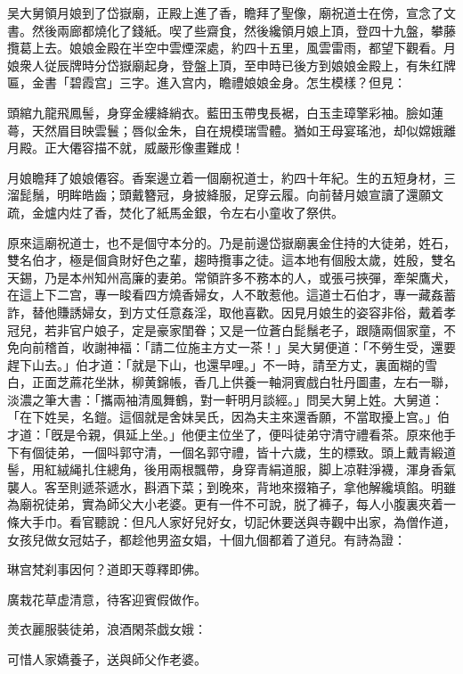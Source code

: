 吴大舅領月娘到了岱嶽廟，正殿上進了香，瞻拜了聖像，廟祝道士在傍，宣念了文書。然後兩廊都燒化了錢紙。喫了些齋食，然後纔領月娘上頂，登四十九盤，攀藤攬葛上去。娘娘金殿在半空中雲煙深處，約四十五里，風雲雷雨，都望下觀看。月娘衆人従辰牌時分岱嶽廟起身，登盤上頂，至申時已後方到娘娘金殿上，有朱红牌匾，金書「碧霞宫」三字。進入宫内，瞻禮娘娘金身。怎生模樣？但見：

\begin{myquote}
頭綰九龍飛鳳髻，身穿金縷絳綃衣。藍田玉帶曳長裾，白玉圭璋擎彩袖。臉如蓮蕚，天然眉目映雲鬟；唇似金朱，自在規模瑞雪體。猶如王母宴瑤池，却似嫦娥離月殿。正大僊容描不就，威嚴形像畫難成！
\end{myquote}

月娘瞻拜了娘娘僊容。香案邊立着一個廟祝道士，約四十年紀。生的五短身材，三溜髭鬚，明眸皓齒；頭戴簪冠，身披絳服，足穿云履。向前替月娘宣讀了還願文疏，金爐内炷了香，焚化了紙馬金銀，令左右小童收了祭供。

原來這廟祝道士，也不是個守本分的。乃是前邊岱嶽廟裏金住持的大徒弟，姓石，雙名伯才，極是個貪財好色之輩，趨時攬事之徒。這本地有個殷太歲，姓殷，雙名天錫，乃是本州知州高廉的妻弟。常領許多不務本的人，或張弓挾彈，牽架鷹犬，在這上下二宫，專一睃看四方燒香婦女，人不敢惹他。這道士石伯才，專一藏姦蓄詐，替他賺誘婦女，到方丈任意姦淫，取他喜歡。因見月娘生的姿容非俗，戴着孝冠兒，若非官户娘子，定是豪家閨眷；又是一位蒼白髭鬚老子，跟隨兩個家童，不免向前稽首，收謝神福：「請二位施主方丈一茶！」吴大舅便道：「不勞生受，還要趕下山去。」伯才道：「就是下山，也還早哩。」不一時，請至方丈，裏面糊的雪白，正面芝蔴花坐牀，柳黄錦帳，香几上供養一軸洞賓戲白牡丹圖畫，左右一聯，淡濃之筆大書：「攜兩袖清風舞鶴，對一軒明月談經。」問吴大舅上姓。大舅道：「在下姓吴，名鎧。這個就是舍妹吴氏，因為夫主來還香願，不當取擾上宫。」伯才道：「旣是令親，俱延上坐。」他便主位坐了，便呌徒弟守清守禮看茶。原來他手下有個徒弟，一個呌郭守清，一個名郭守禮，皆十六歲，生的標致。頭上戴青緞道髻，用紅絨䋲扎住總角，後用兩根飄帶，身穿青絹道服，脚上凉鞋淨襪，渾身香氣襲人。客至則遞茶遞水，斟酒下菜；到晚來，背地來掇箱子，拿他解纔填餡。明雖為廟祝徒弟，實為師父大小老婆。更有一件不可說，脱了褲子，每人小腹裏夾着一條大手巾。看官聽說：但凡人家好兒好女，切記休要送與寺觀中出家，為僧作道，女孩兒做女冠姑子，都趁他男盗女娼，十個九個都着了道兒。有詩為證：

\begin{myquote}
琳宫梵刹事因何？道即天尊釋即佛。

廣栽花草虚清意，待客迎賓假做作。

羙衣麗服裝徒弟，浪酒閑茶戯女娥：

可惜人家嬌養子，送與師父作老婆。
\end{myquote}

